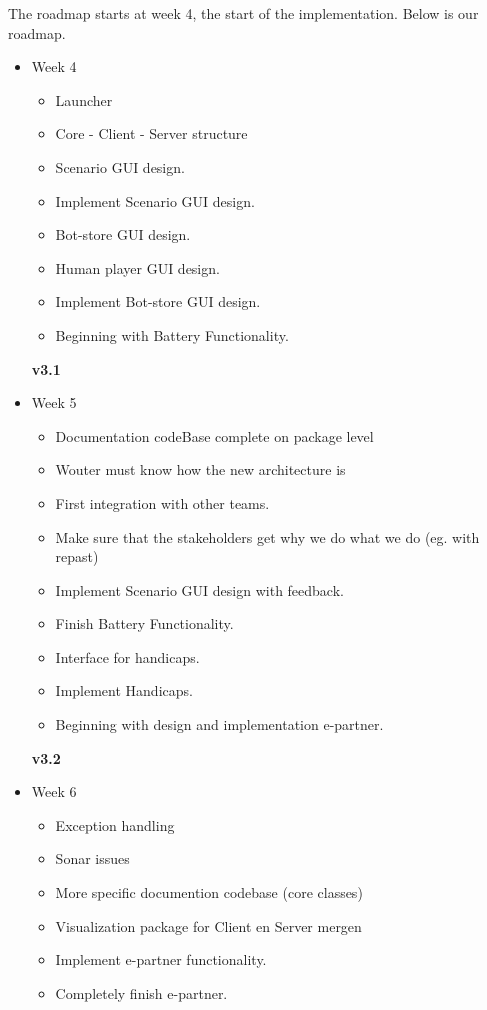 The roadmap starts at week 4, the start of the implementation. Below is our roadmap.

\begin{itemize}
  \item Week 4
  \begin{itemize}
    \item Launcher
      \item Core - Client - Server structure
    \item Scenario GUI design.
    \item Implement Scenario GUI design.
    \item Bot-store GUI design.
    \item Human player GUI design.
    \item Implement Bot-store GUI design.
    \item Beginning with Battery Functionality.
  \end{itemize}
  \textbf{v3.1}
  \item Week 5
  \begin{itemize}
    \item Documentation codeBase complete on package level
      \item Wouter must know how the new architecture is
      \item First integration with other teams.
      \item Make sure that the stakeholders get why we do what we do (eg. with repast)
    \item Implement Scenario GUI design with feedback.
    \item Finish Battery Functionality.
    \item Interface for handicaps.
    \item Implement Handicaps.
    \item Beginning with design and implementation e-partner.
  \end{itemize}
  \textbf{v3.2}
  \item Week 6
  \begin{itemize}
    \item Exception handling
      \item Sonar issues 
      \item More specific documention codebase (core classes)
      \item Visualization package for Client en Server mergen
    \item Implement \gls{e-partner} functionality.
    \item Completely finish e-partner.

\end{itemize}
\end{itemize}

